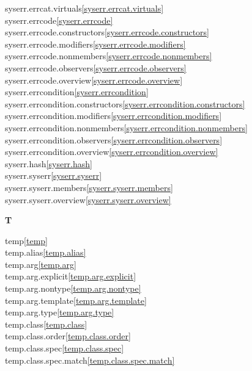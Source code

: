 \begin{multicols}{2}
syserr.errcat.virtuals\quad\ref{syserr.errcat.virtuals}\\
syserr.errcode\quad\ref{syserr.errcode}\\
syserr.errcode.constructors\quad\ref{syserr.errcode.constructors}\\
syserr.errcode.modifiers\quad\ref{syserr.errcode.modifiers}\\
syserr.errcode.nonmembers\quad\ref{syserr.errcode.nonmembers}\\
syserr.errcode.observers\quad\ref{syserr.errcode.observers}\\
syserr.errcode.overview\quad\ref{syserr.errcode.overview}\\
syserr.errcondition\quad\ref{syserr.errcondition}\\
syserr.errcondition.constructors\quad\ref{syserr.errcondition.constructors}\\
syserr.errcondition.modifiers\quad\ref{syserr.errcondition.modifiers}\\
syserr.errcondition.nonmembers\quad\ref{syserr.errcondition.nonmembers}\\
syserr.errcondition.observers\quad\ref{syserr.errcondition.observers}\\
syserr.errcondition.overview\quad\ref{syserr.errcondition.overview}\\
syserr.hash\quad\ref{syserr.hash}\\
syserr.syserr\quad\ref{syserr.syserr}\\
syserr.syserr.members\quad\ref{syserr.syserr.members}\\
syserr.syserr.overview\quad\ref{syserr.syserr.overview}\\
\par \textbf{T}\par
temp\quad\ref{temp}\\
temp.alias\quad\ref{temp.alias}\\
temp.arg\quad\ref{temp.arg}\\
temp.arg.explicit\quad\ref{temp.arg.explicit}\\
temp.arg.nontype\quad\ref{temp.arg.nontype}\\
temp.arg.template\quad\ref{temp.arg.template}\\
temp.arg.type\quad\ref{temp.arg.type}\\
temp.class\quad\ref{temp.class}\\
temp.class.order\quad\ref{temp.class.order}\\
temp.class.spec\quad\ref{temp.class.spec}\\
temp.class.spec.match\quad\ref{temp.class.spec.match}\\

\end{multicols}
